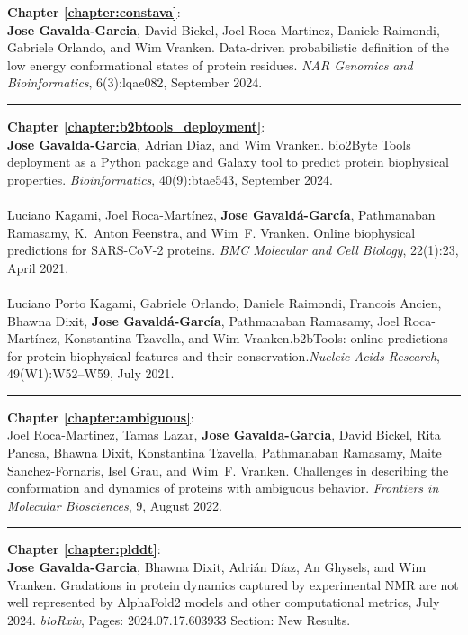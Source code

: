 \noindent
\textbf{Chapter \ref{chapter:constava}}:
\\
\textbf{Jose Gavalda-Garcia}, David Bickel, Joel Roca-Martinez, Daniele Raimondi, Gabriele Orlando, and Wim Vranken. Data-driven probabilistic definition of the low energy conformational states of protein residues.
\textit{NAR Genomics and Bioinformatics}, 6(3):lqae082, September 2024. 
\vspace{0.8 em}
\hrule
\vspace{0.8 em}
\noindent
\textbf{Chapter \ref{chapter:b2btools_deployment}}:
\\
\textbf{Jose Gavalda-Garcia}, Adrian Diaz, and Wim Vranken. bio2Byte Tools deployment as a Python package and Galaxy tool to predict protein biophysical properties. \textit{Bioinformatics}, 40(9):btae543, September 2024.
\\
\\
Luciano Kagami, Joel Roca-Martínez, \textbf{Jose Gavaldá-García}, Pathmanaban Ramasamy, K.~Anton Feenstra, and Wim~F. Vranken. Online biophysical predictions for {SARS}-{CoV}-2 proteins. \textit{BMC Molecular and Cell Biology}, 22(1):23, April 2021.
\\
\\
Luciano Porto Kagami, Gabriele Orlando, Daniele Raimondi, Francois Ancien, Bhawna Dixit, \textbf{Jose Gavaldá-García}, Pathmanaban Ramasamy, Joel Roca-Martínez, Konstantina Tzavella, and Wim Vranken.{b2bTools}: online predictions for protein biophysical features and their conservation.\textit{Nucleic Acids Research}, 49(W1):W52--W59, July 2021.
\vspace{0.8 em}
\hrule
\vspace{0.8 em}
\noindent
\textbf{Chapter \ref{chapter:ambiguous}}:
\\
Joel Roca-Martinez, Tamas Lazar, \textbf{Jose Gavalda-Garcia}, David Bickel, Rita Pancsa, Bhawna Dixit, Konstantina Tzavella, Pathmanaban Ramasamy, Maite Sanchez-Fornaris, Isel Grau, and Wim~F. Vranken.
Challenges in describing the conformation and dynamics of proteins with ambiguous behavior. \textit{Frontiers in Molecular Biosciences}, 9, August 2022.
\vspace{0.8 em}
\hrule
\vspace{0.8 em}
\noindent
\textbf{Chapter \ref{chapter:plddt}}:
\\
\textbf{Jose Gavalda-Garcia}, Bhawna Dixit, Adrián Díaz, An Ghysels, and Wim Vranken. Gradations in protein dynamics captured by experimental NMR are not well represented by AlphaFold2 models and other computational metrics, July 2024. \textit{bioRxiv}, Pages: 2024.07.17.603933 Section: New Results.

